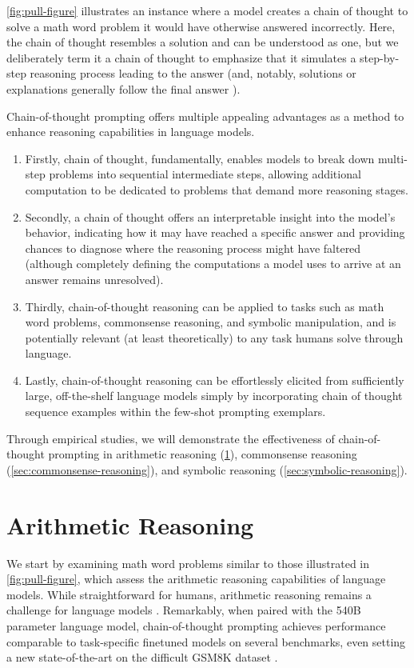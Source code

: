 \cref{fig:pull-figure} illustrates an instance where a model creates a chain of thought to solve a math word problem it would have otherwise answered incorrectly. Here, the chain of thought resembles a solution and can be understood as one, but we deliberately term it a chain of thought to emphasize that it simulates a step-by-step reasoning process leading to the answer (and, notably, solutions or explanations generally follow the final answer \citep[][\textit{inter alia}]{narang2020wt5,wiegreffe2021reframing,lampinen2022can}).

Chain-of-thought prompting offers multiple appealing advantages as a method to enhance reasoning capabilities in language models.

\begin{enumerate}[topsep=1pt,itemsep=0ex]
    \item Firstly, chain of thought, fundamentally, enables models to break down multi-step problems into sequential intermediate steps, allowing additional computation to be dedicated to problems that demand more reasoning stages.
    \item Secondly, a chain of thought offers an interpretable insight into the model’s behavior, indicating how it may have reached a specific answer and providing chances to diagnose where the reasoning process might have faltered (although completely defining the computations a model uses to arrive at an answer remains unresolved).
    \item Thirdly, chain-of-thought reasoning can be applied to tasks such as math word problems, commonsense reasoning, and symbolic manipulation, and is potentially relevant (at least theoretically) to any task humans solve through language.
    \item Lastly, chain-of-thought reasoning can be effortlessly elicited from sufficiently large, off-the-shelf language models simply by incorporating chain of thought sequence examples within the few-shot prompting exemplars.
\end{enumerate}

Through empirical studies, we will demonstrate the effectiveness of chain-of-thought prompting in arithmetic reasoning (\cref{sec:arithmetic-reasoning}), commonsense reasoning (\cref{sec:commonsense-reasoning}), and symbolic reasoning (\cref{sec:symbolic-reasoning}).

\section{Arithmetic Reasoning}\label{sec:arithmetic-reasoning}
We start by examining math word problems similar to those illustrated in \cref{fig:pull-figure}, which assess the arithmetic reasoning capabilities of language models. While straightforward for humans, arithmetic reasoning remains a challenge for language models \citep[][\textit{inter alia}]{hendrycks2021measuring,patel-etal-2021-nlp}. Remarkably, when paired with the 540B parameter language model, chain-of-thought prompting achieves performance comparable to task-specific finetuned models on several benchmarks, even setting a new state-of-the-art on the difficult GSM8K dataset \citep{cobbe2021training}.

